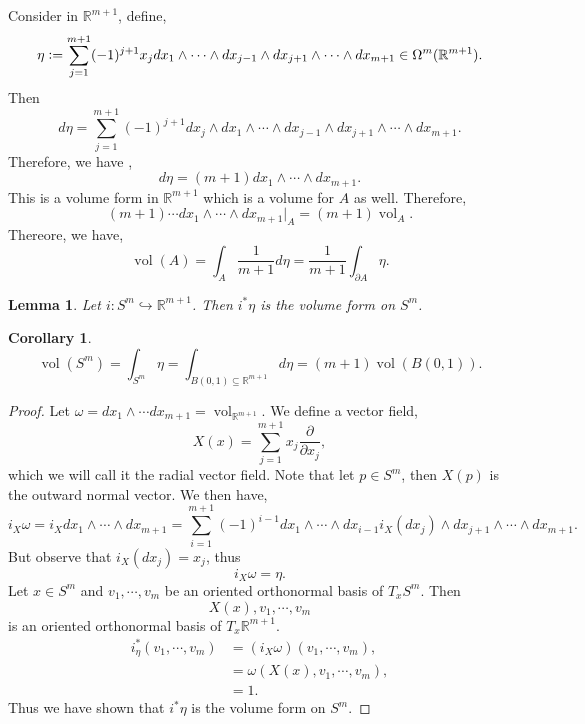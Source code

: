 \documentclass[10pt]{article}
\newtheorem{lemma}{Lemma}[section]
\newtheorem{corollary}{Corollary} [section]
\DeclareMathOperator{\vol}{vol}
\newcommand{\defeq}{\vcentcolon=}
\newcommand{\R}[0]{\mathbb{R}}
\newcommand{\pd}[2]{{\frac {\partial #1} {\partial #2}}}
\begin{document}
Consider in $\R^{m+1}$, define,
\begin{equation*}
\eta\defeq \sum_{j=1}^{m+1}(-1)^{j+1}x_jdx_1\wedge\cdots\wedge dx_{j-1}\wedge dx_{j+1}\wedge\cdots\wedge dx_{m+1}\in\Omega^m(\R^{m+1}).
\end{equation*}
Then 
\begin{equation*}
d\eta = \sum_{j=1}^{m+1}(-1)^{j+1}dx_j\wedge dx_1\wedge\cdots\wedge dx_{j-1}\wedge dx_{j+1}\wedge\cdots\wedge dx_{m+1}.
\end{equation*}
Therefore, we have ,
\begin{equation*}
d\eta = (m+1)dx_1\wedge\cdots\wedge dx_{m+1}.
\end{equation*}
This is a volume form in $\R^{m+1}$ which is a volume for $A$ as well. Therefore,
\begin{equation*}
(m+1)\cdots dx_1\wedge\cdots\wedge dx_{m+1}|_{A} = (m+1)\vol_A.
\end{equation*}
Thereore, we have,
\begin{equation*}
  \vol(A) = \int_A{\frac 1 {m+1}}d\eta = {\frac 1 {m+1}}\int_{\partial A}\eta.
\end{equation*}
\begin{lemma}
  Let $i:S^m\hookrightarrow\R^{m+1}$. Then $i^*\eta$ is the volume form on $S^m$.
\end{lemma}
\begin{corollary}
  \begin{equation*}
  \vol(S^m) = \int_{S^m}\eta = \int_{B(0,1)\subseteq\R^{m+1}}d\eta = (m+1)\vol(B(0,1)).
  \end{equation*}
  \label{corollary_sphere_volume_form}
\end{corollary}
\begin{proof}
  Let $\omega = dx_1\wedge\cdots dx_{m+1} = \vol_{\R^{m+1}}$. We define a vector field,
  \begin{equation*}
    X(x) = \sum_{j=1}^{m+1}x_j\pd{}{x_j},
  \end{equation*}
  which we will call it the radial vector field. Note that let $p\in S^m$, then $X(p)$ is the outward normal vector. We then have,
  \begin{equation*}
    i_X\omega = i_X dx_1\wedge\cdots\wedge dx_{m+1} = \sum_{i=1}^{m+1}(-1)^{i-1}dx_1\wedge\cdots\wedge dx_{i-1} i_X(dx_j)\wedge dx_{j+1}\wedge\cdots \wedge dx_{m+1}.
  \end{equation*}
  But observe that $i_X(dx_j) = x_j$, thus 
  \begin{equation*}
    i_X\omega = \eta.
  \end{equation*}
  Let $x\in S^m$ and $v_1,\cdots,v_m$ be an oriented orthonormal basis of $T_xS^m$. Then 
  \begin{equation*}
    X(x),v_1,\cdots,v_m
  \end{equation*}
  is an oriented orthonormal basis of $T_x\R^{m+1}$. 
  \begin{align*}
    i^*_\eta(v_1,\cdots,v_m) &= (i_X\omega)(v_1,\cdots,v_m),\\
    & = \omega(X(x),v_1,\cdots,v_m),\\
    & = 1.
  \end{align*}
  Thus we have shown that $i^*\eta$ is the volume form on $S^m$.
\end{proof}
\end{document}
